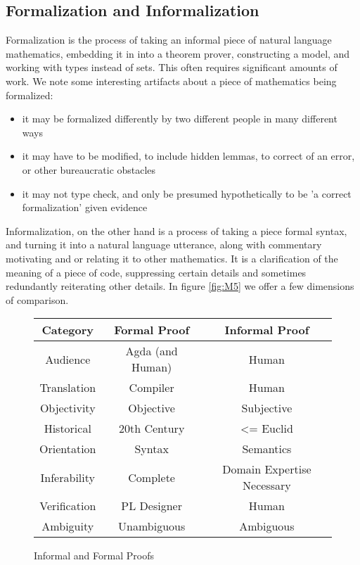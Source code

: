 \subsection{Formalization and Informalization}

Formalization is the process of taking an informal piece of natural language
mathematics, embedding it in into a theorem prover, constructing a model,
and working with types instead of sets. This often requires significant amounts of
work. We note some interesting artifacts about a piece of mathematics
being formalized:

\begin{itemize}

\item it may be formalized differently by two different people in many different ways
\item it may have to be modified, to include hidden lemmas, to correct of an
  error, or other bureaucratic obstacles
\item it may not type check, and only be presumed hypothetically to be 'a
  correct formalization' given evidence 

\end{itemize}

Informalization, on the other hand is a process of taking a piece formal syntax, and turning it into a natural
language utterance, along with commentary motivating and or relating it to other
mathematics. It is a clarification of the meaning of a piece of
code, suppressing certain details and sometimes
redundantly reiterating other details. In figure \autoref{fig:M5} we offer a few
dimensions of comparison.

\begin{figure}
\centering
\begin{tabular}{|c|c|c|} \hline
  Category & Formal Proof & Informal Proof \\ \hline
  Audience & Agda (and Human) & Human \\ \hline
  Translation & Compiler & Human \\ \hline
  Objectivity & Objective & Subjective \\ \hline %
  Historical & 20th Century & <= Euclid \\ \hline
  Orientation & Syntax & Semantics \\ \hline
  Inferability & Complete & Domain Expertise Necessary \\ \hline
  Verification & PL Designer & Human \\ \hline
  Ambiguity & Unambiguous & Ambiguous \\ \hline

\end{tabular}
\caption{Informal and Formal Proofs} \label{fig:M5}
\end{figure}

